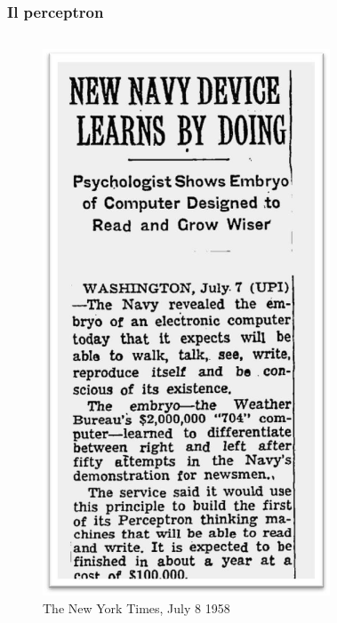 \begin{frame}
	
	\frametitle{Il perceptron}
	
		\begin{columns}
	
			\begin{figure}[!htbp]
				\centering
				\includegraphics[width=0.46\linewidth]{images/supervised/perceptron/The_New_York_Times_July_8_1958.jpg}
				\caption{The New York Times, July 8 1958}
			\end{figure}
			
			
			
			\begin{figure}[!htbp]
				\centering


\end{figure}
\end{columns}
\end{frame}
